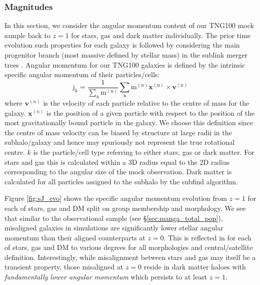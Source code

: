 \subsubsection{Magnitudes}
In this section, we consider the angular momentum content of our TNG100 mock sample back to $z=1$ for stars, gas and dark matter individually. The prior time evolution such properties for each galaxy is followed by considering the main progenitor branch (most massive defined by stellar mass) in the sublink merger trees \citep{rgomez2015}. Angular momentum for our TNG100 galaxies is defined by the intrinsic specific angular momentum of their particles/cells:
\begin{equation}
\mathrm{j_{k} = \frac{1}{\sum_{n} m^{(n)}} \sum_{n} m^{(n)}\boldsymbol{x}^{(n)} \times \boldsymbol{v}^{(n)}}
\end{equation}
where $\boldsymbol{v}^{(n)}$ is the velocity of each particle relative to the centre of mass for the galaxy. $\boldsymbol{x}^{(n)}$ is the position of a given particle with respect to the position of the most gravitationally bound particle in the galaxy. We choose this definition since the centre of mass velocity can be biased by structure at large radii in the subhalo/galaxy and hence may spuriously not represent the true rotational centre. $k$ is the particle/cell type referring to either stars, gas or dark matter. For stars and gas this is calculated within a 3D radius equal to the 2D radius corresponding to the angular size of the mock observation. Dark matter is calculated for all particles assigned to the subhalo by the subfind algorithm. 

Figure \ref{fig:sJ_evo} shows the specific angular momentum evolution from $z=1$ for each of stars, gas and DM split on group membership and morphology. We see that similar to the observational sample (see \S\ref{sec:manga_total_pop}), misaligned galaxies in simulations are significantly lower stellar angular momentum than their aligned counterparts at $z=0$. This is reflected in for each of stars, gas and DM to various degrees for all morphologies and central/satellite definition. Interestingly, while misalignment between stars and gas may itself be a transient property, those misaligned at $z = 0$ reside in dark matter haloes with \textit{fundamentally lower angular momentum} which persists to at least $z = 1$. 

